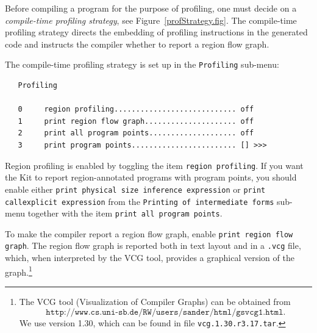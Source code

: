 \documentclass[12pt]{book}
\begin{document}
Before compiling a program for the purpose of profiling, one must decide on a
%
{\em compile-time profiling strategy}, see
Figure~\ref{profStrategy.fig}.  The compile-time profiling strategy
directs the embedding of profiling instructions in the generated code
and instructs the compiler whether to report a region flow graph.

The compile-time profiling strategy is set up in the 
%
{\tt Profiling} sub-menu:


\begin{verbatim}
   Profiling

   0     region profiling............................ off
   1     print region flow graph..................... off
   2     print all program points.................... off
   3     print program points........................ [] >>>
\end{verbatim}
\noindent
Region profiling is enabled by toggling the item
%
\mbox{{\tt region profiling}}. If you want the Kit to report
region-annotated programs with program points, you should enable
either 
%
{\tt print physical size inference expression} or
%
{\tt print call\-explicit expression} from the {\tt Printing of
  intermediate forms} sub-menu together with the item 
%
{\tt print all program points}.

To make the compiler report a region flow graph, enable
%
{\tt print region flow graph}. The region flow
graph is reported both in text layout and in a {\tt .vcg} file, which,
when interpreted by the 
%
VCG tool, provides a graphical version of the graph.\footnote{The VCG
  tool (Visualization of Compiler Graphs) can be obtained from
  \[\texttt{http://www.cs.uni-sb.de/RW/users/sander/html/gsvcg1.html}.\]
  We use version 1.30, which can be found in file
  \texttt{vcg.1.30.r3.17.tar}.}
\end{document}
